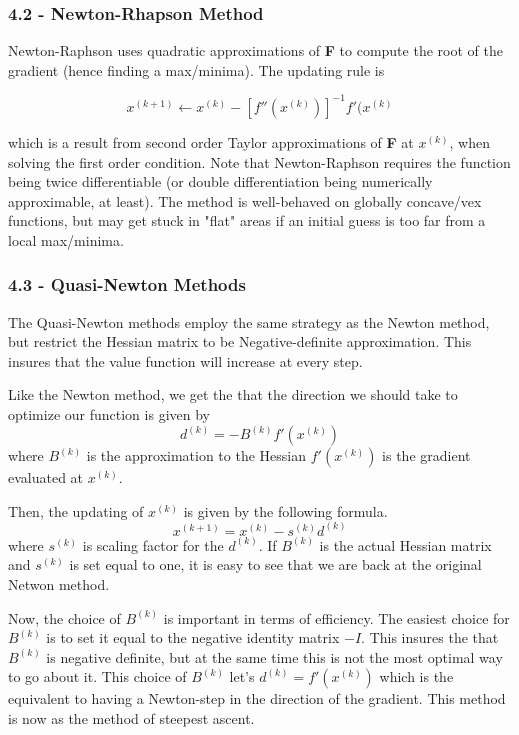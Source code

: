 \documentclass{article}
\begin{document}
\subsubsection*{4.2 - Newton-Rhapson Method}

Newton-Raphson uses quadratic approximations of \textbf{F} to compute the root of the gradient (hence finding a max/minima). The updating rule is 

$$x^{(k+1)} \leftarrow x^{(k)} - [f''(x^{(k)})]^{-1}f'(x^{(k)}$$

which is a result from second order Taylor approximations of \textbf{F} at $x^{(k)}$, when solving the first order condition. Note that Newton-Raphson requires the function being twice differentiable (or double differentiation being numerically approximable, at least). The method is well-behaved on globally concave/vex functions, but may get stuck in "flat" areas if an initial guess is too far from a local max/minima. 

\subsubsection*{4.3 - Quasi-Newton Methods}


The Quasi-Newton methods employ the same strategy as the Newton method, but restrict the Hessian matrix to be Negative-definite approximation. This insures that the value function will increase at every step.

Like the Newton method, we get the that the direction we should take to optimize our function is given by
$$
d^{(k)}= - B^{(k)}f'(x^{(k)})
$$
where $B^{(k)}$ is the approximation to the Hessian $f'(x^{(k)})$ is the gradient evaluated at $x^{(k)}$.

Then, the updating of $x^{(k)}$ is given by the following formula.
$$
x^{(k+1)}= x^{(k)}-s^{(k)}d^{(k)}
$$
where $s^{(k)}$ is scaling factor for the $d^{(k)}$. If $B^{(k)}$ is the actual Hessian matrix and $s^{(k)}$ is set equal to one, it is easy to see that we are back at the original Netwon method.

Now, the choice of $B^{(k)}$ is important in terms of efficiency. The easiest choice for $B^{(k)}$ is to set it equal to the negative identity matrix $-I$. This insures the that $B^{(k)}$ is negative definite, but at the same time this is not the most optimal way to go about it. This choice of $B^{(k)}$ let's $d^{(k)}= f'(x^{(k)})$ which is the equivalent to having a Newton-step in the direction of the gradient. This method is now as the method of steepest ascent. 
\end{document}
